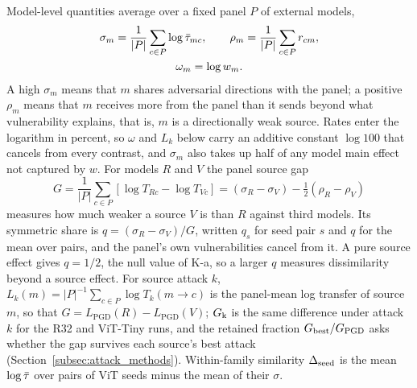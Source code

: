 Model-level quantities average over a fixed panel $P$ of external models,
\begin{equation}
\begin{gathered}
\sigma_m = \frac{1}{|P|}\sum_{c\in P}\log\bar{\tau}_{mc}, \qquad \rho_m = \frac{1}{|P|}\sum_{c\in P} r_{cm},\\
\omega_m = \log w_m.
\end{gathered}
\label{eq:panel_def}
\end{equation}
A high $\sigma_m$ means that $m$ shares adversarial directions with the panel; a positive $\rho_m$ means that $m$ receives more from the panel than it sends beyond what vulnerability explains, that is, $m$ is a directionally weak source. Rates enter the logarithm in percent, so $\omega$ and $L_k$ below carry an additive constant $\log 100$ that cancels from every contrast, and $\sigma_m$ also takes up half of any model main effect not captured by $w$. For models $R$ and $V$ the panel source gap
\begin{equation*}
G = \frac{1}{|P|}\sum_{c\in P}\left[\log T_{Rc} - \log T_{Vc}\right] = (\sigma_R - \sigma_V) - \tfrac12(\rho_R - \rho_V)
\end{equation*}
measures how much weaker a source $V$ is than $R$ against third models. Its symmetric share is $q = (\sigma_R - \sigma_V)/G$, written $q_s$ for seed pair $s$ and $q$ for the mean over pairs, and the panel's own vulnerabilities cancel from it. A pure source effect gives $q = 1/2$, the null value of K-a, so a larger $q$ measures dissimilarity beyond a source effect. For source attack $k$, $L_k(m) = |P|^{-1}\sum_{c\in P}\log T_k(m\to c)$ is the panel-mean log transfer of source $m$, so that $G = L_{\mathrm{PGD}}(R) - L_{\mathrm{PGD}}(V)$; $G_{\mathrm{k}}$ is the same difference under attack $k$ for the R32 and ViT-Tiny runs, and the retained fraction $G_{\mathrm{best}}/G_{\mathrm{PGD}}$ asks whether the gap survives each source's best attack (Section~\ref{subsec:attack_methods}). Within-family similarity $\Delta_{\mathrm{seed}}$ is the mean $\log\bar{\tau}$ over pairs of ViT seeds minus the mean of their $\sigma$.

